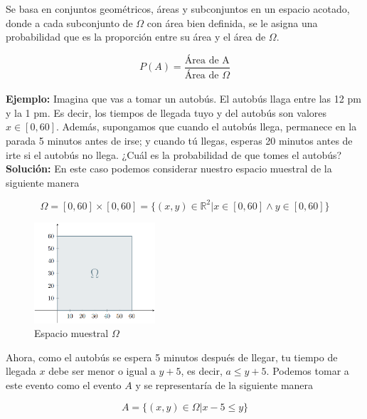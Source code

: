 \noindent Se basa en conjuntos geométricos, áreas y subconjuntos en un espacio acotado, donde a cada subconjunto de $\Omega$ con área bien definida, se le asigna una probabilidad que es la proporción entre su área y el área de $\Omega$.

\begin{equation}
    P(A) = \frac{\text{Área de A}}{\text{Área de $\Omega$}} 
\end{equation}
\\
\noindent\textbf{Ejemplo:} Imagina que vas a tomar un autobús. El autobús llaga entre las 12 pm y la 1 pm. Es decir, los tiempos de llegada tuyo y del autobús son valores $x \in [0, 60]$. Además, supongamos que cuando el autobús llega, permanece en la parada 5 minutos antes de irse; y cuando tú llegas, esperas 20 minutos antes de irte si el autobús no llega. ¿Cuál es la probabilidad de que tomes el autobús? \\

\noindent\textbf{Solución:} En este caso podemos considerar nuestro espacio muestral de la siguiente manera

\begin{equation*}
    \Omega = [0,60] \times [0,60] = \{(x,y) \in \mathbb{R}^{2} | x \in [0,60] \wedge y \in [0,60]\}
\end{equation*}

\begin{figure}[H] 
    \centering 
    \includegraphics[width=0.4\textwidth]{1 Introducción/1.1 Tipos de probabilidad/1.1 Imágenes/Probabilidad geometrica 2.png}
    \caption{Espacio muestral $\Omega$}
\end{figure}

\noindent Ahora, como el autobús se espera 5 minutos después de llegar, tu tiempo de llegada $x$ debe ser menor o igual a $y+5$, es decir, $a \leq y+5$. Podemos tomar a este evento como el evento $A$ y se representaría de la siguiente manera

\begin{equation*}
    A = \{(x,y) \in \Omega | x-5 \leq y\}
\end{equation*}

